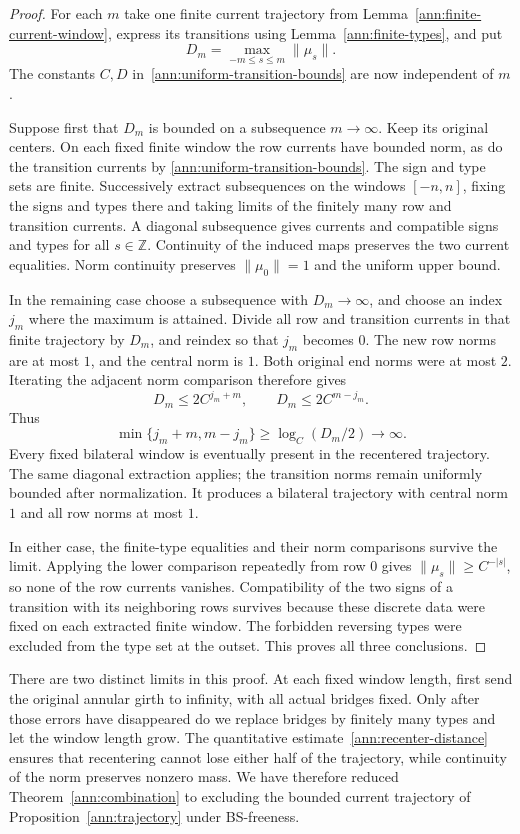 \begin{proof}
For each $m$ take one finite current trajectory from
Lemma~\ref{ann:finite-current-window}, express its transitions using
Lemma~\ref{ann:finite-types}, and put
\[
 D_m=\max_{-m\leq s\leq m}\|\mu_s\|.
\]
The constants $C,D$ in~\eqref{ann:uniform-transition-bounds} are
now independent of $m$.

Suppose first that $D_m$ is bounded on a subsequence $m\to\infty$.
Keep its original centers.  On each fixed finite window the row
currents have bounded norm, as do the transition currents by
\eqref{ann:uniform-transition-bounds}.  The sign and type sets are
finite.  Successively extract subsequences on the windows
$[-n,n]$, fixing the signs and types there and taking limits of the
finitely many row and transition currents.  A diagonal subsequence
gives currents and compatible signs and types for all $s\in\mathbb Z$.
Continuity of the induced maps preserves the two current equalities.
Norm continuity preserves $\|\mu_0\|=1$ and the uniform upper bound.

In the remaining case choose a subsequence with $D_m\to\infty$,
and choose an index $j_m$ where the maximum is attained.  Divide all
row and transition currents in that finite trajectory by $D_m$, and
reindex so that $j_m$ becomes $0$.  The new row norms are at most
$1$, and the central norm is $1$.  Both original end norms were
at most $2$.  Iterating the adjacent norm comparison therefore gives
\[
 D_m\leq2C^{j_m+m},\qquad D_m\leq2C^{m-j_m}.
\]
Thus
\begin{equation}
 \min\{j_m+m,m-j_m\}\geq\log_C(D_m/2)\longrightarrow\infty.
 \label{ann:recenter-distance}
\end{equation}
Every fixed bilateral window is eventually present in the recentered
trajectory.  The same diagonal extraction applies; the transition
norms remain uniformly bounded after normalization.  It produces
a bilateral trajectory with central norm $1$ and all row norms at
most $1$.

In either case, the finite-type equalities and their norm comparisons
survive the limit.  Applying the lower comparison repeatedly from
row $0$ gives $\|\mu_s\|\geq C^{-|s|}$, so none of the row currents
vanishes.  Compatibility of the two signs of a transition with its
neighboring rows survives because these discrete data were fixed
on each extracted finite window.  The forbidden reversing types
were excluded from the type set at the outset.  This proves all
three conclusions.
\end{proof}

There are two distinct limits in this proof.  At each fixed window
length, first send the original annular girth to infinity, with all
actual bridges fixed.  Only after those errors have disappeared do we
replace bridges by finitely many types and let the window length grow.
The quantitative estimate~\eqref{ann:recenter-distance} ensures that
recentering cannot lose either half of the trajectory, while continuity
of the norm preserves nonzero mass.  We have therefore reduced
Theorem~\ref{ann:combination} to excluding the bounded current
trajectory of Proposition~\ref{ann:trajectory} under BS-freeness.
